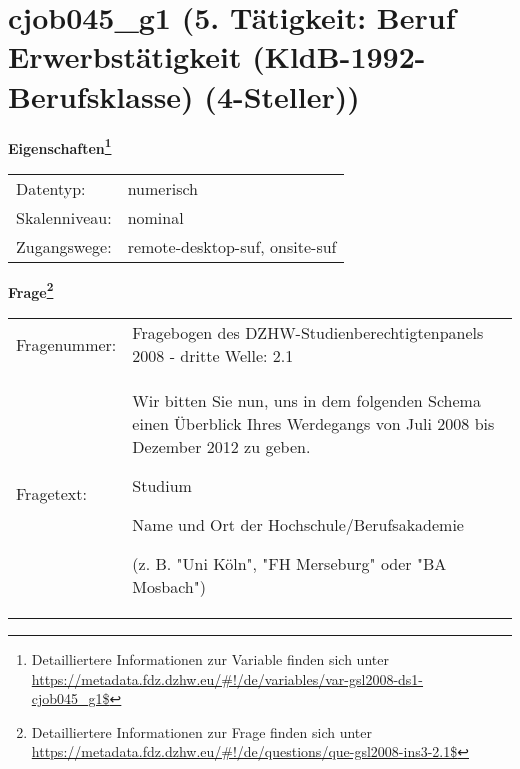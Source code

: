 
    \setcounter{footnote}{0}

    \vspace*{-1.8cm}
	\section{cjob045\_g1 (5. Tätigkeit: Beruf Erwerbstätigkeit (KldB-1992-Berufsklasse) (4-Steller))}
	\label{section:cjob045_g1}



    \vspace*{0.5cm}
    \noindent\textbf{Eigenschaften\footnote{Detailliertere Informationen zur Variable finden sich unter
		\url{https://metadata.fdz.dzhw.eu/\#!/de/variables/var-gsl2008-ds1-cjob045_g1$}}}\\
	\begin{tabularx}{\hsize}{@{}lX}
	Datentyp: & numerisch \\
	Skalenniveau: & nominal \\
	Zugangswege: &
	  remote-desktop-suf, 
	  onsite-suf
 \\
    \end{tabularx}



				\vspace*{0.5cm}
                \noindent\textbf{Frage\footnote{Detailliertere Informationen zur Frage finden sich unter
		              \url{https://metadata.fdz.dzhw.eu/\#!/de/questions/que-gsl2008-ins3-2.1$}}}\\
				\begin{tabularx}{\hsize}{@{}lX}
					Fragenummer: &
					  Fragebogen des DZHW-Studienberechtigtenpanels 2008 - dritte Welle:
					  2.1
 \\
					Fragetext: & Wir bitten Sie nun, uns in dem folgenden Schema einen Überblick Ihres Werdegangs von Juli 2008 bis Dezember 2012 zu geben.\par  Studium\par  Name und Ort der Hochschule/Berufsakademie\par  (z. B. "Uni Köln", "FH Merseburg" oder "BA Mosbach") \\
				\end{tabularx}






